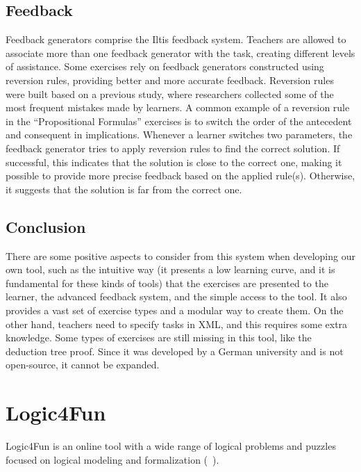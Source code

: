 \subsection{Feedback}
\label{chap:iltis-feedback}
Feedback generators comprise the Iltis feedback system. Teachers are allowed to associate more than one feedback generator with the task, creating different levels of assistance. Some exercises rely on feedback generators constructed using reversion rules, providing better and more accurate feedback. Reversion rules were built based on a previous study, where researchers collected some of the most frequent mistakes made by learners. A common example of a reversion rule in the “Propositional Formulas” exercises is to switch the order of the antecedent and consequent in implications. Whenever a learner switches two parameters, the feedback generator tries to apply reversion rules to find the correct solution. If successful, this indicates that the solution is close to the correct one, making it possible to provide more precise feedback based on the applied rule(s). Otherwise, it suggests that the solution is far from the correct one.

\subsection{Conclusion}
There are some positive aspects to consider from this system when developing our own tool, such as the intuitive way (it presents a low learning curve, and it is fundamental for these kinds of tools) that the exercises are presented to the learner, the advanced feedback system, and the simple access to the tool. It also provides a vast set of exercise types and a modular way to create them. On the other hand, teachers need to specify tasks in XML, and this requires some extra knowledge. Some types of exercises are still missing in this tool, like the deduction tree proof. Since it was developed by a German university and is not open-source, it cannot be expanded.

\section{Logic4Fun}

Logic4Fun is an online tool with a wide range of logical problems and puzzles focused on logical modeling and formalization (~\cite{slaney_logic}).

